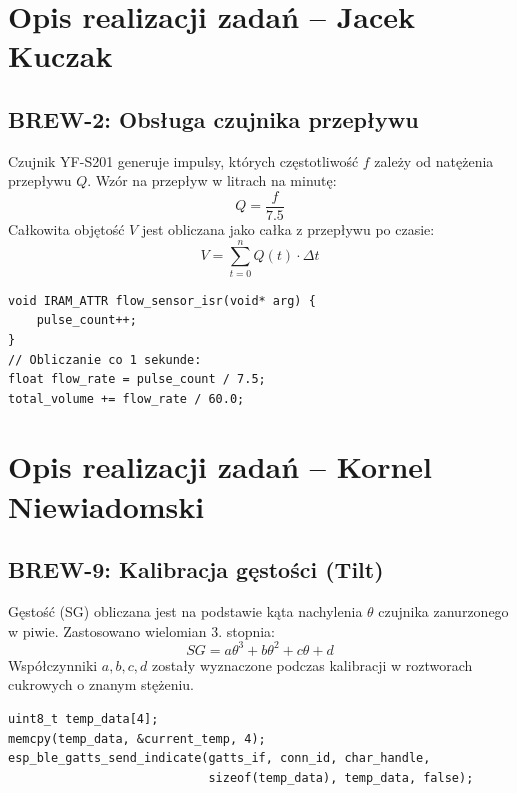 \documentclass[12pt,a4paper]{article}
\begin{document}
\section{Opis realizacji zadań -- Jacek Kuczak}
\subsection{BREW-2: Obsługa czujnika przepływu}
Czujnik YF-S201 generuje impulsy, których częstotliwość $f$ zależy od natężenia przepływu $Q$.
Wzór na przepływ w litrach na minutę:
\begin{equation}
Q = \frac{f}{7.5}
\end{equation}
Całkowita objętość $V$ jest obliczana jako całka z przepływu po czasie:
\begin{equation}
V = \sum_{t=0}^{n} Q(t) \cdot \Delta t
\end{equation}

\begin{lstlisting}[caption=Kod obsługi przerwania przepływomierza]
void IRAM_ATTR flow_sensor_isr(void* arg) {
    pulse_count++;
}
// Obliczanie co 1 sekunde:
float flow_rate = pulse_count / 7.5;
total_volume += flow_rate / 60.0;
\end{lstlisting}

\section{Opis realizacji zadań -- Kornel Niewiadomski}
\subsection{BREW-9: Kalibracja gęstości (Tilt)}
Gęstość (SG) obliczana jest na podstawie kąta nachylenia $\theta$ czujnika zanurzonego w piwie.
Zastosowano wielomian 3. stopnia:
\begin{equation}
SG = a\theta^3 + b\theta^2 + c\theta + d
\end{equation}
Współczynniki $a, b, c, d$ zostały wyznaczone podczas kalibracji w roztworach cukrowych o znanym stężeniu.

\begin{lstlisting}[caption=Implementacja BLE GATT Notify]
uint8_t temp_data[4];
memcpy(temp_data, &current_temp, 4);
esp_ble_gatts_send_indicate(gatts_if, conn_id, char_handle, 
                            sizeof(temp_data), temp_data, false);
\end{lstlisting}
\end{document}
